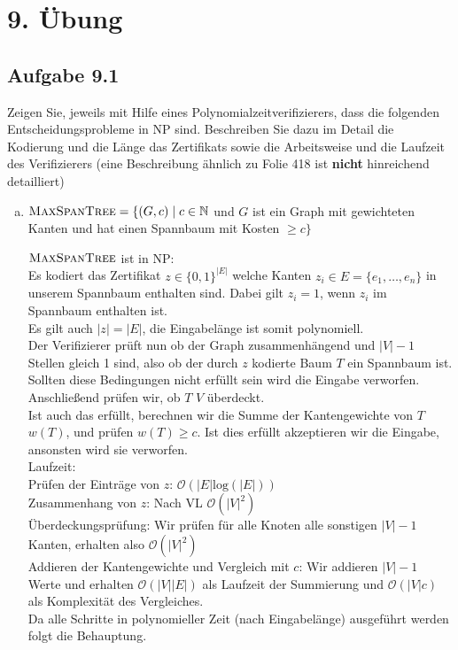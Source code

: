 \section*{9. Übung}
\subsection*{Aufgabe 9.1}
Zeigen Sie, jeweils mit Hilfe eines Polynomialzeitverifizierers, dass die folgenden Entscheidungsprobleme in NP sind. Beschreiben Sie dazu im Detail die Kodierung und die Länge das Zertifikats sowie die Arbeitsweise und die Laufzeit des Verifizierers (eine Beschreibung ähnlich zu Folie 418 ist \textbf{nicht} hinreichend detailliert)
\begin{enumerate}[(a)]
	\item $\textsc{MaxSpanTree} = \{ (G,c) \mid c \in \mathbb{N} $ und $G $ ist ein Graph mit gewichteten Kanten und hat einen Spannbaum mit Kosten $ \geq c \}$
	
	$\textsc{MaxSpanTree}$ ist in NP:\\
	Es kodiert das Zertifikat $z \in \{ 0,1 \}^{|E|}$ welche Kanten $z_i \in E=\{e_1, \dots, e_n \}$ in unserem Spannbaum enthalten sind. Dabei gilt $z_i = 1$, wenn $z_i$ im Spannbaum enthalten ist.\\
	Es gilt auch $|z| = |E|$, die Eingabelänge ist somit polynomiell.\\
	Der Verifizierer prüft nun ob der Graph zusammenhängend und $|V|-1$ Stellen gleich 1 sind, also ob der durch $z$ kodierte Baum $T$ ein Spannbaum ist. Sollten diese Bedingungen nicht erfüllt sein wird die Eingabe verworfen.\\
	Anschließend prüfen wir, ob $T$ $V$ überdeckt.\\
	Ist auch das erfüllt, berechnen wir die Summe der Kantengewichte von $T$ $w(T)$, und prüfen $w(T) \geq c$. Ist dies erfüllt akzeptieren wir die Eingabe, ansonsten wird sie verworfen.\\
	
	Laufzeit:\\
	Prüfen der Einträge von $z$: $\mathcal{O}(|E|\text{log}(|E|))$\\
	Zusammenhang von $z$: Nach VL $\mathcal{O}(|V|^2)$\\
	Überdeckungsprüfung: Wir prüfen für alle Knoten alle sonstigen $|V|-1$ Kanten, erhalten also $\mathcal{O}(|V|^2)$\\
	Addieren der Kantengewichte und Vergleich mit $c$: Wir addieren $|V|-1$ Werte und erhalten $\mathcal{O}(|V||E|)$ als Laufzeit der Summierung und $\mathcal{O}(|V|c)$ als Komplexität des Vergleiches.\\
	Da alle Schritte in polynomieller Zeit (nach Eingabelänge) ausgeführt werden folgt die Behauptung.\\
	 

\end{enumerate}
